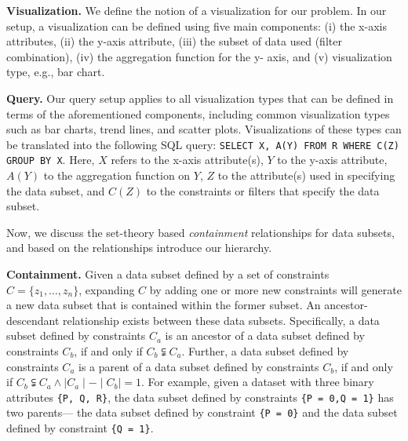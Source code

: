 
\textbf{Visualization.} We define the notion of a visualization for our problem. In our setup, a visualization can be defined using five main components: (i) the x-axis attributes, (ii) the y-axis attribute, (iii) the subset of data used (filter combination), (iv) the aggregation function for the y- axis, and (v) visualization type, e.g., bar chart.

\textbf{Query.} Our query setup applies to all visualization types that can be defined in terms of the aforementioned components, including common visualization types such as bar charts, trend lines, and scatter plots. Visualizations of these types can be translated into the following \textsc{SQL} query: {\tt SELECT X, A(Y) FROM R WHERE C(Z) GROUP BY X}. Here, $X$ refers to the x-axis attribute(s), $Y$ to the y-axis attribute, $A(Y)$ to the aggregation function on $Y$, $Z$ to the attribute(s) used in specifying the data subset, and $C(Z)$ to the constraints or filters that specify the data subset.

Now, we discuss the set-theory based \emph{containment} relationships for data subsets, and based on the relationships introduce our hierarchy.

\textbf{Containment.} Given a data subset defined by a set of constraints $C = \{z_1, \ldots, z_n\}$, expanding $C$ by adding one or more new constraints will generate a new data subset that is contained within the former subset. An ancestor-descendant relationship exists between these data subsets. Specifically, a data subset defined by constraints $C_a$ is an ancestor of a data subset defined by constraints $C_b$, if and only if $C_b \subsetneqq C_a$. Further, a data subset defined by constraints $C_a$ is a parent of a data subset defined by constraints $C_b$, if and only if $C_b \subsetneqq C_a \land \mid C_a \mid - \mid C_b \mid = 1$. For example, given a dataset with three binary attributes {\tt \{P, Q, R\}}, the data subset defined by constraints {\tt \{P = 0,Q = 1\}} has two parents--- the data subset defined by constraint {\tt \{P = 0\}} and the data subset defined by constraint {\tt \{Q = 1\}}.

